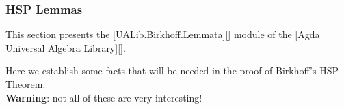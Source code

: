 \subsubsection{HSP Lemmas}\label{hsp-lemmas}
This section presents the {[}UALib.Birkhoff.Lemmata{]}{[}{]} module of
the {[}Agda Universal Algebra Library{]}{[}{]}.

Here we establish some facts that will be needed in the proof of
Birkhoff's HSP Theorem.\\
\textbf{Warning}: not all of these are very interesting!

\begin{code}%
\>[0]\<%
\\
\>[0]\AgdaSymbol{\{-\#}\AgdaSpace{}%
\AgdaSpace{}%
\AgdaSpace{}%
\AgdaSpace{}%
\AgdaSpace{}%
\AgdaSymbol{\#-\}}\<%
\\
%
\\[\AgdaEmptyExtraSkip]%
\>[0]\AgdaSpace{}%
\AgdaSpace{}%
\AgdaSpace{}%
\AgdaSpace{}%
\AgdaSymbol{(}\AgdaSymbol{;}\AgdaSpace{}%
\AgdaSymbol{;}\AgdaSpace{}%
\AgdaSymbol{;}\AgdaSpace{}%
\AgdaSymbol{;}\AgdaSpace{}%
\AgdaSymbol{)}\<%
\\
\>[0]\AgdaSpace{}%
\AgdaSpace{}%
\AgdaSpace{}%
\AgdaSpace{}%
\AgdaSymbol{(}\AgdaSymbol{;}\AgdaSpace{}%
\AgdaSymbol{;}\AgdaSpace{}%
\AgdaSymbol{)}\<%
\\
%
\\[\AgdaEmptyExtraSkip]%
%
\\[\AgdaEmptyExtraSkip]%
\>[0]\AgdaSpace{}%
\<%
\\
\>[0][@{}l@{\AgdaIndent{0}}]%
\>[1]\AgdaSymbol{\{}\AgdaSpace{}%
\AgdaSymbol{:}\AgdaSpace{}%
\AgdaSpace{}%
\AgdaSpace{}%
\AgdaSymbol{\}\{}\AgdaSpace{}%
\AgdaSymbol{:}\AgdaSpace{}%
\AgdaSymbol{\}}\<%
\\
%
\>[1]\AgdaSymbol{\{}\AgdaSpace{}%
\AgdaSymbol{:}\AgdaSpace{}%
\AgdaSymbol{\{}\AgdaSpace{}%

\end{code}
